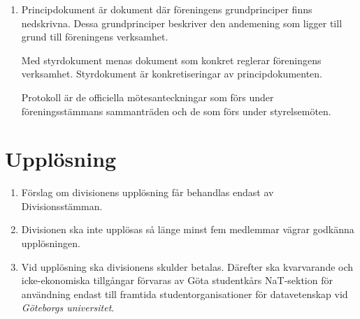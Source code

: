 \documentclass{dvd}
\begin{document}
\begin{enumerate}[label=\arabic* §, ref=\arabic*]
		\item Principdokument är dokument där föreningens grundprinciper finns nedskrivna.
		Dessa grundprinciper beskriver den andemening som ligger till grund till föreningens verksamhet.

		Med styrdokument menas dokument som konkret reglerar föreningens verksamhet.
		Styrdokument är konkretiseringar av principdokumenten.

		Protokoll är de officiella mötesanteckningar som förs under föreningsstämmans sammanträden och de som förs under styrelsemöten.


	\end{enumerate}


	\section{Upplösning}

	\begin{enumerate}[label=\arabic* §, ref=\arabic*]

		\item Förslag om divisionens upplösning får behandlas endast av Divisionsstämman.

		\item Divisionen ska inte upplösas så länge minst fem medlemmar vägrar godkänna upplösningen.

		\item Vid upplösning ska divisionens skulder betalas.
		Därefter ska kvarvarande och icke-ekonomiska tillgångar förvaras av Göta studentkårs NaT-sektion för användning endast till framtida studentorganisationer för datavetenskap vid \emph{Göteborgs universitet}.

	\end{enumerate}
\end{document}
